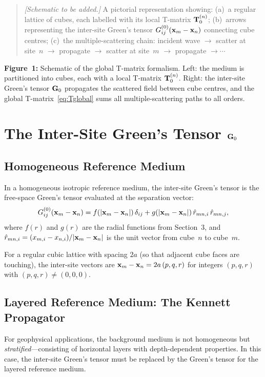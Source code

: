\begin{quote}
\textit{[Schematic to be added.]}  A pictorial representation showing:
(a)~a regular lattice of cubes, each labelled with its local T-matrix
$\mathbf{T}_0^{(n)}$;
(b)~arrows representing the inter-site Green's tensor
$G_{ij}^{(0)}(\mathbf{x}_m-\mathbf{x}_n)$ connecting cube centres;
(c)~the multiple-scattering chain: incident wave $\to$ scatter at site~$n$
$\to$ propagate $\to$ scatter at site~$m$ $\to$ propagate $\to\cdots$
\end{quote}

\noindent\textbf{Figure~1:}  Schematic of the global T-matrix formalism.
Left: the medium is partitioned into cubes, each with a local T-matrix
$\mathbf{T}_0^{(n)}$.  Right: the inter-site Green's tensor $\mathbf{G}_0$ propagates the
scattered field between cube centres, and the global T-matrix~\eqref{eq:Tglobal}
sums all multiple-scattering paths to all orders.


\section{The Inter-Site Green's Tensor $\mathbf{G}_0$}

\subsection{Homogeneous Reference Medium}

In a homogeneous isotropic reference medium, the inter-site Green's tensor
is the free-space Green's tensor evaluated at the separation vector:
\begin{equation}
  G_{ij}^{(0)}(\mathbf{x}_m - \mathbf{x}_n)
  = f(|\mathbf{x}_m-\mathbf{x}_n|)\,\delta_{ij}
  + g(|\mathbf{x}_m-\mathbf{x}_n|)\,\hat{r}_{mn,i}\,\hat{r}_{mn,j},
\label{eq:G0homog}
\end{equation}
where $f(r)$ and $g(r)$ are the radial functions from Section~3, and
$\hat{r}_{mn,i} = (x_{m,i}-x_{n,i})/|\mathbf{x}_m-\mathbf{x}_n|$ is the unit vector
from cube~$n$ to cube~$m$.

For a regular cubic lattice with spacing $2a$ (so that adjacent cube faces
are touching), the inter-site vectors are
$\mathbf{x}_m - \mathbf{x}_n = 2a\,(p,q,r)$ for integers $(p,q,r)$ with
$(p,q,r)\neq(0,0,0)$.

\subsection{Layered Reference Medium: The Kennett Propagator}

For geophysical applications, the background medium is not homogeneous but
\emph{stratified}---consisting of horizontal layers with depth-dependent
properties.  In this case, the inter-site Green's tensor must be replaced
by the Green's tensor for the layered reference medium.


